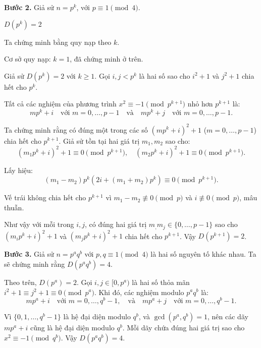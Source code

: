 \begin{problem}
\begin{soln}
    \textbf{Bước 2.} Giả sử \( n = p^k \), với \( p \equiv 1 \pmod{4} \).
    \begin{claim*}
        \( D(p^k) = 2 \)
    \end{claim*} 
    \begin{subproof}
        Ta chứng minh bằng quy nạp theo \( k \).

        Cơ sở quy nạp: \( k = 1 \), đã chứng minh ở trên.

        Giả sử \( D(p^k) = 2 \) với \( k \ge 1 \). Gọi \( i, j < p^k \) là hai số sao cho \( i^2 + 1 \) và \( j^2 + 1 \) chia hết cho \( p^k \).
    
        Tất cả các nghiệm của phương trình \( x^2 \equiv -1 \pmod{p^{k+1}} \) nhỏ hơn \( p^{k+1} \) là:
        \[
            m p^k + i \quad \text{với } m = 0, \ldots, p-1 \quad \text{và} \quad m p^k + j \quad \text{với } m = 0, \ldots, p - 1.
        \]

        Ta chứng minh rằng có đúng một trong các số \( (m p^k + i)^2 + 1 \) ($m = 0, \ldots, p-1$) chia hết cho \( p^{k+1} \).
        Giả sử tồn tại hai giá trị \( m_1, m_2 \) sao cho:
        \[
            (m_1 p^k + i)^2 + 1 \equiv 0 \pmod{p^{k+1}},\quad (m_2 p^k + i)^2 + 1 \equiv 0 \pmod{p^{k+1}}.
        \]

        Lấy hiệu:
        \[
            (m_1 - m_2)p^k(2i + (m_1 + m_2)p^k) \equiv 0 \pmod{p^{k+1}}.
        \]

        Vế trái không chia hết cho \( p^{k+1} \) vì \( m_1 - m_2 \not\equiv 0 \pmod{p} \) và \( i \not\equiv 0 \pmod{p} \), mâu thuẫn.

        Như vậy với mỗi trong \( i, j \), có đúng hai giá trị \( m_, m_j \in \{0, \ldots, p-1\} \) sao cho $(m_i p^k + i)^2 + 1$ và $(m_j p^k + i)^2 + 1$
        chia hết cho \( p^{k+1} \). Vậy \( D(p^{k+1}) = 2 \).
    \end{subproof}
   
    \textbf{Bước 3.} Giả sử \( n = p^a q^b \) với \( p, q \equiv 1 \pmod{4} \) là hai số nguyên tố khác nhau. Ta sẽ chứng minh rằng \( D(p^a q^b) = 4 \).

    Theo trên, \( D(p^a) = 2 \). Gọi \( i, j \in [0, p^a) \) là hai số thỏa mãn \( i^2 + 1 \equiv j^2 + 1 \equiv 0 \pmod{p^a} \). 
    Khi đó, các nghiệm modulo \( p^a q^b \) là:
    \[
        m p^a + i \quad \text{với } m = 0, \ldots, q^b - 1, \quad \text{và} \quad m p^a + j \quad \text{với } m = 0, \ldots, q^b - 1.
    \]

    Vì \( \{0, 1, \ldots, q^b - 1\} \) là hệ đại diện modulo \( q^b \), và \( \gcd(p^a, q^b) = 1 \), 
    nên các dãy \( m p^a + i \) cũng là hệ đại diện modulo \( q^b \). Mỗi dãy chứa đúng hai giá trị sao cho \( x^2 \equiv -1 \pmod{q^b} \). 
    Vậy \( D(p^a q^b) = 4 \).


\end{soln}
\end{problem}
